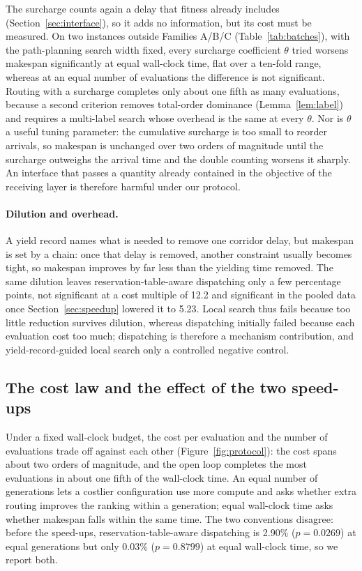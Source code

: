 \documentclass[preprint,review,12pt,authoryear]{elsarticle}
\newcommand{\CostMultBefore}{12.2}
\newcommand{\CostMultAfter}{5.23}
\newcommand{\GainProbeSameGen}{2.90\%}
\newcommand{\PProbeSameGen}{=0.0269}
\newcommand{\GainProbeSameClock}{0.03\%}
\newcommand{\PProbeSameClock}{=0.8799}
\begin{document}
The surcharge counts again a delay that fitness already includes (Section~\ref{sec:interface}), so it adds no information, but its cost must be measured. On two instances outside Families A/B/C (Table~\ref{tab:batches}), with the path-planning search width fixed, every surcharge coefficient $\theta$ tried worsens makespan significantly at equal wall-clock time, flat over a ten-fold range, whereas at an equal number of evaluations the difference is not significant. Routing with a surcharge completes only about one fifth as many evaluations, because a second criterion removes total-order dominance (Lemma~\ref{lem:label}) and requires a multi-label search whose overhead is the same at every $\theta$. Nor is $\theta$ a useful tuning parameter: the cumulative surcharge is too small to reorder arrivals, so makespan is unchanged over two orders of magnitude until the surcharge outweighs the arrival time and the double counting worsens it sharply. An interface that passes a quantity already contained in the objective of the receiving layer is therefore harmful under our protocol.

\paragraph{Dilution and overhead.}
\label{sec:whycost}
A yield record names what is needed to remove one corridor delay, but makespan is set by a chain: once that delay is removed, another constraint usually becomes tight, so makespan improves by far less than the yielding time removed. The same dilution leaves reservation-table-aware dispatching only a few percentage points, not significant at a cost multiple of \CostMultBefore{} and significant in the pooled data once Section~\ref{sec:speedup} lowered it to \CostMultAfter{}. Local search thus fails because too little reduction survives dilution, whereas dispatching initially failed because each evaluation cost too much; dispatching is therefore a mechanism contribution, and yield-record-guided local search only a controlled negative control.


\subsection{The cost law and the effect of the two speed-ups}
\label{sec:costlaw}

Under a fixed wall-clock budget, the cost per evaluation and the number of evaluations trade off against each other (Figure~\ref{fig:protocol}): the cost spans about two orders of magnitude, and the open loop completes the most evaluations in about one fifth of the wall-clock time. An equal number of generations lets a costlier configuration use more compute and asks whether extra routing improves the ranking within a generation; equal wall-clock time asks whether makespan falls within the same time. The two conventions disagree: before the speed-ups, reservation-table-aware dispatching is \GainProbeSameGen{} ($p\PProbeSameGen$) at equal generations but only \GainProbeSameClock{} ($p\PProbeSameClock$) at equal wall-clock time, so we report both.
\end{document}
